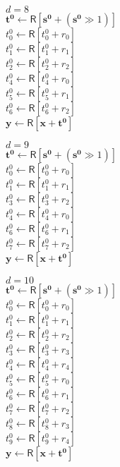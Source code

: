 \documentclass{article}
\newcommand{\reg}[1]{\mathsf{R}\left[#1\right]}
\newcommand{\vect}[1]{\mathbf{#1}}
\begin{document}
\begin{multicols}{3}
{        {\centering $d=8$ \\}
        \noindent
        $\vect{t^0} \leftarrow \reg{\vect{s^0} + (\vect{s^0} \gg 1)}$ \\
        $t^0_0 \leftarrow \reg{t^0_0 + r_0}$ \\
        $t^0_1 \leftarrow \reg{t^0_1 + r_1}$ \\
        $t^0_2 \leftarrow \reg{t^0_2 + r_2}$ \\
        $t^0_4 \leftarrow \reg{t^0_4 + r_0}$ \\
        $t^0_5 \leftarrow \reg{t^0_5 + r_1}$ \\
        $t^0_6 \leftarrow \reg{t^0_6 + r_2}$ \\
        $\vect{y} \leftarrow \reg{\vect{x} + \vect{t^0}}$

        {\centering $d=9$ \\}
        \noindent
        $\vect{t^0} \leftarrow \reg{\vect{s^0} + (\vect{s^0} \gg 1)}$ \\
        $t^0_0 \leftarrow \reg{t^0_0 + r_0}$ \\
        $t^0_1 \leftarrow \reg{t^0_1 + r_1}$ \\
        $t^0_3 \leftarrow \reg{t^0_3 + r_2}$ \\
        $t^0_4 \leftarrow \reg{t^0_4 + r_0}$ \\
        $t^0_6 \leftarrow \reg{t^0_6 + r_1}$ \\
        $t^0_7 \leftarrow \reg{t^0_7 + r_2}$ \\
        $\vect{y} \leftarrow \reg{\vect{x} + \vect{t^0}}$

        {\centering $d=10$ \\}
        \noindent
        $\vect{t^0} \leftarrow \reg{\vect{s^0} + (\vect{s^0} \gg 1)}$ \\
        $t^0_0 \leftarrow \reg{t^0_0 + r_0}$ \\
        $t^0_1 \leftarrow \reg{t^0_1 + r_1}$ \\
        $t^0_2 \leftarrow \reg{t^0_2 + r_2}$ \\
        $t^0_3 \leftarrow \reg{t^0_3 + r_3}$ \\
        $t^0_4 \leftarrow \reg{t^0_4 + r_4}$ \\
        $t^0_5 \leftarrow \reg{t^0_5 + r_0}$ \\
        $t^0_6 \leftarrow \reg{t^0_6 + r_1}$ \\
        $t^0_7 \leftarrow \reg{t^0_7 + r_2}$ \\
        $t^0_8 \leftarrow \reg{t^0_8 + r_3}$ \\
        $t^0_9 \leftarrow \reg{t^0_9 + r_4}$ \\
        $\vect{y} \leftarrow \reg{\vect{x} + \vect{t^0}}$

}
\end{multicols}
\end{document}
